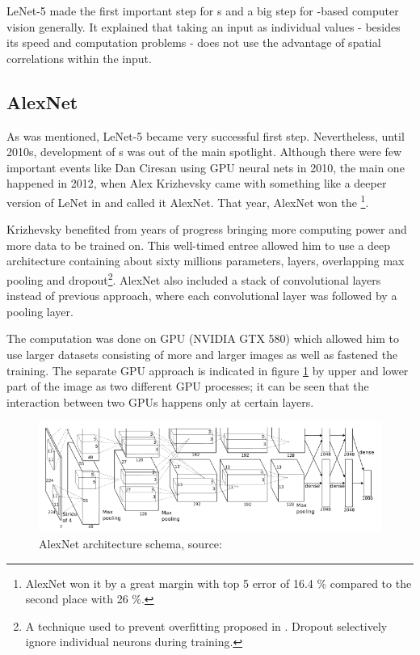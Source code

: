 LeNet-5 made the first important step for s and a big step for 
-based computer vision generally. It explained that taking an input as 
individual values - besides its speed and computation problems - does not use 
the advantage of spatial correlations within the input. 



\subsection{AlexNet} %
\label{alexnet}

As was mentioned, LeNet-5 became very successful first step. Nevertheless, until 
2010s, development of s was out of the main spotlight. Although there 
were few important events like Dan Ciresan using GPU neural nets in 2010, the 
main one happened in 2012, when Alex Krizhevsky came with something like a 
deeper version of LeNet in \cite{cnn-classification} and called it AlexNet. That 
year, AlexNet won the \footnote{AlexNet won it by a great margin with 
top 5 error of 16.4 \% compared to the second place with 26 \%.}.

Krizhevsky benefited from years of progress bringing more computing power and 
more data to be trained on. This well-timed entree allowed him to use a deep 
architecture containing about sixty millions parameters,  layers, 
overlapping max pooling and dropout\footnote{A technique used to prevent 
overfitting proposed in \cite{dropout}. Dropout selectively ignore individual 
neurons during training.}. AlexNet also included a stack of convolutional layers 
instead of previous approach, where each convolutional layer was followed by a 
pooling layer. 

The computation was done on GPU (NVIDIA GTX 580) which allowed him to use larger 
datasets consisting of more and larger images as well as fastened the training. 
The separate GPU approach is indicated in figure \ref{fig:alexnet} by upper and 
lower part of the image as two different GPU processes; it can be seen that the 
interaction between two GPUs happens only at certain layers. 

\begin{figure}[H]
   \centering
	\includegraphics[width=\linewidth]{./pictures/alexnet.png}
	\caption[AlexNet architecture]{AlexNet architecture schema, source: 
\cite{cnn-classification}}
      \label{fig:alexnet}
\end{figure}


